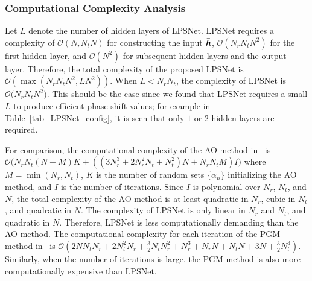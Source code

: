 \documentclass[conference]{IEEEtran}
\begin{document}
	\subsubsection{Computational Complexity Analysis}
	Let $L$ denote the number of hidden layers of LPSNet. LPSNet requires a complexity of $\mathcal{O}(N_rN_tN)$ for constructing the input $\bar{\textbf{\textit{h}}}$, $\mathcal{O}(N_rN_tN^2)$ for the first hidden layer, and $\mathcal{O}(N^2)$ for subsequent hidden layers and the output layer. Therefore, the total complexity of the proposed LPSNet is $\mathcal{O}(\max(N_rN_tN^2,LN^2))$. When $L<N_rN_t$, the complexity of LPSNet is $\mathcal{O(}N_rN_tN^2)$. This should be the case since we found that LPSNet requires a small $L$ to produce efficient phase shift values; for example in Table~\ref{tab_LPSNet_config}, it is seen that only $1$ or $2$ hidden layers are required.
	
	For comparison, the computational complexity of the AO method in~\cite{zhang2020capacity} is $\mathcal{O}\big(N_rN_t(N + M)K + ((3N_r^3 + 2N_r^2N_t + N_t^2)N + N_rN_tM)I \big)$ where $M = \min(N_r,N_t)$, $K$ is the number of random sets $\{\alpha_n\}$ initializing the AO method, and $I$ is the number of iterations. Since $I$ is polynomial over $N_r$, $N_t$, and $N$, the total complexity of the AO method is at least quadratic in $N_r$, cubic in $N_t$, and quadratic in $N$. The complexity of LPSNet is only linear in $N_r$ and $N_t$, and quadratic in $N$. Therefore, LPSNet is less computationally demanding than the AO method. The computational complexity for each iteration of the PGM method in~\cite{perovic2020achievable} is
	$\mathcal{O}(2NN_tN_r + 2N_t^2 N_r + \frac{3}{2}N_tN_r^2 + N_r^3 + N_rN + N_tN + 3N + \frac{3}{2}N_t^3)$. Similarly, when the number of iterations is large, the PGM method is also more computationally expensive than LPSNet.
	
\end{document}
